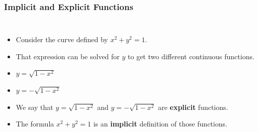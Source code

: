 \documentclass[serif,ignorenonframetext]{beamer}
\begin{document}
\begin{frame}
  \frametitle{Implicit and Explicit Functions}
  \begin{columns}
  \begin{itemize}[<+->]
  \item Consider the curve defined by $x^2+y^2=1$.
  \item That expression can be solved for $y$ to get
    two different continuous functions.
  \item $y=\sqrt{1-x^2}$
  \item $y=-\sqrt{1-x^2}$
  \item We say that $y=\sqrt{1-x^2}$ and $y=-\sqrt{1-x^2}$
    are \textbf{explicit} functions.
  \item The formula $x^2+y^2=1$ is an \textbf{implicit}
    definition of those functions.
  \end{itemize}

\end{columns}
\end{frame}
\end{document}
